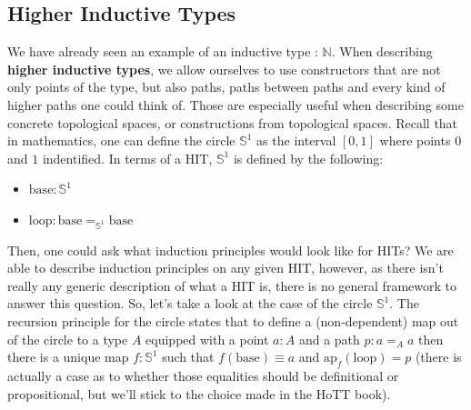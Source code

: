 \documentclass{report}
\begin{document}
\subsection{Higher Inductive Types}
We have already seen an example of an inductive type : $\mathbb N$. When describing \textbf{higher inductive types}, we allow ourselves to use constructors that are not only points of the type, but also paths, paths between paths and every kind of higher paths one could think of. Those are especially useful when describing some concrete topological spaces, or constructions from topological spaces. Recall that in mathematics, one can define the circle $\mathbb{S}^1$ as the interval $[0,1]$ where points $0$ and $1$ indentified. In terms of a HIT, $\mathbb{S}^1$ is defined by the following: \\
\begin{minipage}{.5\linewidth}
  \begin{itemize}
    \item $\mathrm{base} : \mathbb{S}^1$
    \item $\mathrm{loop} : \mathrm{base} =_{\mathbb{S}^1} \mathrm{base}$
  \end{itemize}
\end{minipage}
\hfill
\begin{minipage}{.5\linewidth}
  \begin{center}
  \end{center}
\end{minipage}
Then, one could ask what induction principles would look like for HITs? We are able to describe induction principles on any given HIT, however, as there isn't really any generic description of what a HIT is, there is no general framework to answer this question. So, let's take a look at the case of the circle $\mathbb{S}^1$. The recursion principle for the circle states that to define a (non-dependent) map out of the circle to a type $A$ equipped with a point $a :A$ and a path $ p : a=_A a$ then there is a unique map $f : \mathbb{S}^1$ such that $f(\mathrm{base}) \equiv a$ and $\mathrm{ap}_f(\mathrm{loop}) =p$ (there is actually a case as to whether those equalities should be definitional or propositional, but we'll stick to the choice made in the HoTT book).\\
\end{document}
